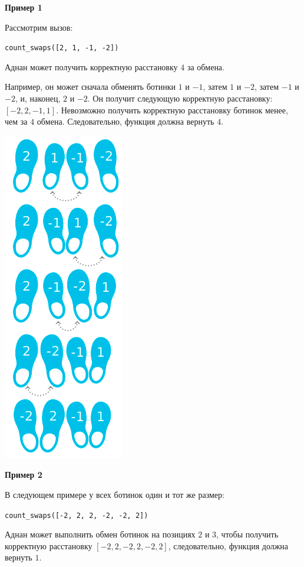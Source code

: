 \textbf{Пример 1}

Рассмотрим вызов:

\texttt{count\_swaps([2, 1, -1, -2])}

Аднан может получить корректную расстановку $4$ за обмена.

Например, он может сначала обменять ботинки $1$ и $-1$, затем $1$ и $-2$, затем $-1$ и
$-2$, и, наконец, $2$ и $-2$. Он получит следующую корректную расстановку: $[-2, 2, -1, 1]$. Невозможно получить корректную расстановку ботинок менее, чем
за $4$ обмена. Следовательно, функция должна вернуть $4$.

\includegraphics{1.png}

\textbf{Пример 2}

В следующем примере у всех ботинок один и тот же размер:


\texttt{count\_swaps([-2, 2, 2, -2, -2, 2])}


Аднан может выполнить обмен ботинок на позициях $2$ и $3$, чтобы получить
корректную расстановку $[-2, 2, -2, 2, -2, 2]$, следовательно, функция должна вернуть $1$.
